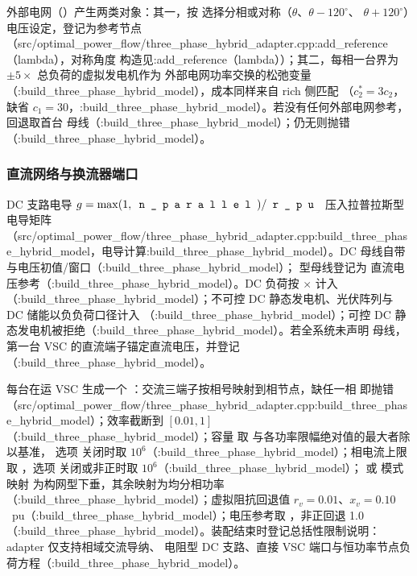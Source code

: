外部电网（）产生两类对象：其一，按
 选择分相或对称（$\theta$、$\theta-120^\circ$、
$\theta+120^\circ$）电压设定，登记为参考节点（src/optimal\_power\_flow/three\_phase\_hybrid\_adapter.cpp:add\_reference（lambda），对称角度
构造见:add\_reference（lambda））；其二，每相一台界为 $\pm 5\times$ 总负荷的虚拟发电机作为
外部电网功率交换的松弛变量（:build\_three\_phase\_hybrid\_model），成本同样来自 rich 侧匹配
（$c_2^*=3c_2$，缺省 $c_1=30$，:build\_three\_phase\_hybrid\_model）。若没有任何外部电网参考，
回退取首台  母线（:build\_three\_phase\_hybrid\_model）；仍无则抛错
（:build\_three\_phase\_hybrid\_model）。

\subsubsection*{直流网络与换流器端口}
DC 支路电导 $g=\max(1,\fld{n\_parallel})/\fld{r\_pu}$ 压入拉普拉斯型电导矩阵
（src/optimal\_power\_flow/three\_phase\_hybrid\_adapter.cpp:build\_three\_phase\_hybrid\_model，电导计算:build\_three\_phase\_hybrid\_model）。DC 母线自带
 与电压初值/窗口（:build\_three\_phase\_hybrid\_model）； 型母线登记为
直流电压参考（:build\_three\_phase\_hybrid\_model）。DC 负荷按 $\times$
计入（:build\_three\_phase\_hybrid\_model）；不可控 DC 静态发电机、光伏阵列与 DC 储能以负负荷口径计入
（:build\_three\_phase\_hybrid\_model）；可控 DC 静态发电机被拒绝（:build\_three\_phase\_hybrid\_model）。若全系统未声明
 母线，第一台 VSC 的直流端子锚定直流电压，并登记
（:build\_three\_phase\_hybrid\_model）。

每台在运 VSC 生成一个 ：交流三端子按相号映射到相节点，缺任一相
即抛错（src/optimal\_power\_flow/three\_phase\_hybrid\_adapter.cpp:build\_three\_phase\_hybrid\_model）；效率截断到 $[0.01,1]$（:build\_three\_phase\_hybrid\_model）；容量
 取  与各功率限幅绝对值的最大者除以基准，
选项  关闭时取 $10^6$（:build\_three\_phase\_hybrid\_model）；相电流上限
取 ，选项  关闭或非正时取
$10^6$（:build\_three\_phase\_hybrid\_model）； 或  模式映射
为构网型下垂，其余映射为均分相功率（:build\_three\_phase\_hybrid\_model）；虚拟阻抗回退值
$r_v=0.01$、$x_v=0.10$~pu（:build\_three\_phase\_hybrid\_model）；电压参考取 ，非正回退
1.0（:build\_three\_phase\_hybrid\_model）。装配结束时登记总括性限制说明：adapter 仅支持相域交流导纳、
电阻型 DC 支路、直接 VSC 端口与恒功率节点负荷方程（:build\_three\_phase\_hybrid\_model）。

